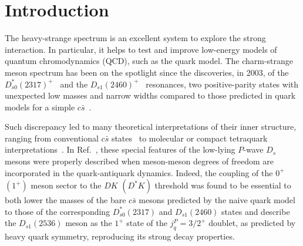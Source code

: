 \documentclass[aps, prd, floatfix, twocolumn, superscriptaddress, nofootinbib]{revtex4-1}
\begin{document}


\maketitle


\section{Introduction}
\label{sec:Introduction}

The heavy-strange spectrum is an excellent system to explore the strong interaction.
In particular, it helps to test and improve low-energy models of quantum chromodynamics (QCD), such
as the quark model.
The charm-strange meson spectrum has been on the spotlight since the discoveries, in 2003, of the
$D_{s0}^*(2317)^+$~\cite{Aubert:2003fg} and the $D_{s1}(2460)^+$~\cite{Besson:2003cp} resonances, two positive-parity states
with unexpected low masses and narrow widths compared to those predicted in quark models for a simple $c\bar s$~\cite{Godfrey:1986wj,Zeng:1994vj, Gupta:1994mw}.

Such discrepancy led to many theoretical interpretations of their inner structure, ranging
from conventional $c\bar{s}$
states~\cite{Fayyazuddin:2003aa, Sadzikowski:2003jy, Lakhina:2006fy} to
molecular or compact tetraquark interpretations~\cite{Barnes:2003dj,
Lipkin:2003zk, Bicudo:2004dx, Szczepaniak:2003vy, Browder:2003fk,
Nussinov:2003uj, Dmitrasinovic:2005gc,Yang:2021tvc}.
%
In Ref.~\cite{Ortega:2016mms}, these special features of the low-lying $P$-wave $D_s$ mesons were properly
described when meson-meson degrees of freedom are incorporated in the quark-antiquark dynamics. Indeed, the coupling of the $0^{+}$ $(1^{+})$ meson sector to
the $DK$ $(D^{\ast}K)$ threshold was found to be essential to both lower the masses of the bare $c\bar s$ mesons predicted by the naive quark model to those of the corresponding $D_{s0}^{\ast}(2317)$ and $D_{s1}(2460)$ states and describe the $D_{s1}(2536)$ meson as the $1^{+}$ state of the $j_{q}^{P}=3/2^{+}$ doublet, as predicted by heavy quark symmetry, reproducing its strong decay properties.
\end{document}
